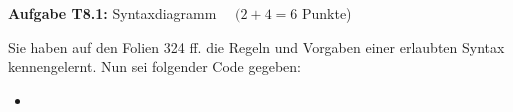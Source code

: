 \RequirePackage{fix-cm}


\newcommand{\obenlinks}{Übungen zur Vorlesung Informatik I}   %




\graphicspath{ {./images/} }

\textbf{Aufgabe T8.1:} Syntaxdiagramm $\quad(2+4=6$ Punkte) 

Sie haben auf den Folien 324 ff. die Regeln und Vorgaben einer erlaubten Syntax kennengelernt. Nun sei folgender Code gegeben:

\begin{itemize}
  \item []\inputminted[]{Java}{exampleA8_1.java}
\end{itemize}

